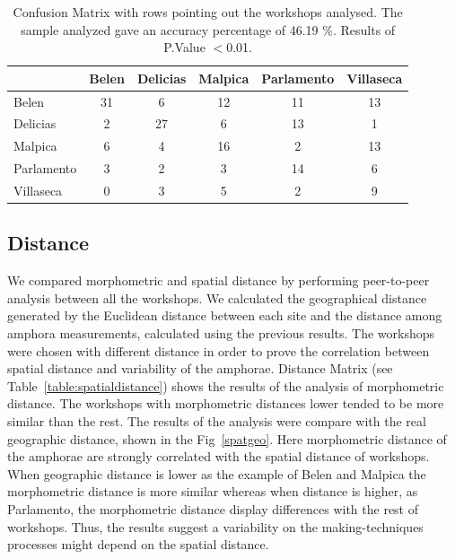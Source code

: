 \documentclass[review]{elsarticle}
\begin{document}
\begin{table}[htp]
\begin{tabular}{lccccc}
\hline
      & Belen & Delicias & Malpica & Parlamento & Villaseca\\ \hline
Belen &   31  &      6   &   12    &     11     &   13 \\
Delicias&  2  &     27   &    6    &     13     &    1  \\
Malpica &  6  &      4   &   16    &      2     &   13   \\
Parlamento & 3&      2   &   3     &      14    &    6    \\
Villaseca  & 0&      3   &    5    &      2     &    9     \\
\hline

\end{tabular}
\caption{Confusion Matrix with rows pointing out the workshops analysed. The sample analyzed gave an accuracy percentage of 46.19 $\%$. Results of P.Value $<$0.01. }
\label{table:confusion}
\end{table}

\subsection{Distance}

We compared morphometric and spatial distance by performing peer-to-peer analysis between all the workshops. We calculated the geographical distance generated by the Euclidean distance between each site and the distance among amphora measurements, calculated using the previous results. The workshops were chosen with different distance in order to prove the correlation between spatial distance and variability of the amphorae. Distance Matrix (see Table~\ref{table:spatialdistance}) shows the results of the analysis of morphometric distance. The workshops with morphometric distances lower tended to be more similar than the rest. The results of the analysis were compare with the real geographic distance, shown in the Fig~\ref{spatgeo}. Here morphometric distance of the amphorae are strongly correlated with the spatial distance of workshops. When geographic distance is lower as the example of Belen and Malpica the morphometric distance is more similar whereas when distance is higher, as Parlamento, the morphometric distance display differences with the rest of workshops. Thus, the results suggest a variability on the making-techniques processes might depend on the spatial distance.  

\end{document}
